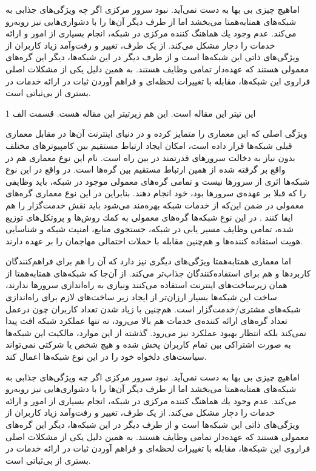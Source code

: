 \documentclass[12pt,twoside]{xepersian-magazine}
\begin{document}
\begin{article}{1}
اماهيچ چيزی بی‌ بها به دست نمی‌آید. نبود سرور مرکزی اگر چه  ويژگی‌های جذابی به شبکه‌های همتابه‌همتا می‌بخشد اما از طرف ديگر آن‌ها را با دشواری‌هايی نيز روبه‌رو می‌کند.  عدم وجود يك هماهنگ كننده مركزی در شبكه، انجام بسياری از امور و ارائه خدمات را  دچار مشكل می‌کند.  از يک طرف، تغيير و رفت‌وآمد زیاد کاربران از ويژگی‌های ذاتی اين شبکه‌ها است و از طرف ديگر در اين شبكه‌ها، ديگر اين گره‌های معمولی  هستند كه  عهده‌دار تمامی وظايف هستند. به همين دلیل يکی از مشکلات اصلی فراروی اين شبكه‌ها، مقابله با  تغييرات لحظه‌ای و فراهم آوردن ثبات در ارائه  خدمات در بستری از بی‌ثباتی است.
\end{article}

\articlesep

\begin{article}{1}
	{این تیتر این مقاله است.}
	{این هم زیرتیتر این مقاله هست.}
	{قسمت الف}
	{1}

\noindent{}
ويژگی اصلی که اين معماری را متمايز کرده و در دنيای اينترنت آن‌ها در مقابل معماری قبلی شبكه‌ها قرار داده است، امكان ايجاد ارتباط مستقيم  بين كامپيوترهای مختلف بدون نياز به دخالت سرورهای قدرتمند در بين راه است.  نام‌ اين نوع معماری هم در واقع بر گرفته شده از همین  ارتباط مستقیم بين گره‌ها است.  در واقع در اين نوع شبكه‌ها اثری از سرورها نيست و تمامی گره‌های معمولی موجود در شبكه، بايد وظايفی را که قبلا بر عهده‌ی سرورها بود، خود انجام دهند. بنابراين در اين نوع معماری گره‌های معمولی در ضمن اين‌که از خدمات شبکه بهره‌مند می‌شود بايد نقش خدمت‌گزار را هم ايفا کنند . در اين نوع شبکه‌ها گره‌های معمولی به كمك روش‌ها و پروتكل‌های توزيع شده، تمامی وظايف  مسير يابی در شبكه، جستجوی منابع، امنيت شبكه و شناسايی هويت استفاده كننده‌ها و هم‌چنين مقابله با حملات احتمالی مهاجمان را بر عهده دارند.

اما معماری همتابه‌همتا ويژگی‌های ديگری نيز دارد که آن را هم برای فراهم‌کنندگان کاربردها و هم برای استفاده‌کنندگان جذاب‌تر می‌کند.  از آن‌جا که شبکه‌های همتابه‌همتا از همان زيرساخت‌های اينترنت استفاده می‌کنند ونيازی به راه‌اندازی سرورها ندارند، ساخت اين شبكه‌ها بسيار ارزان‌تر از ايجاد زير ساخت‌های لازم برای راه‌اندازی شبكه‌های مشتری/خدمت‌گزار است.  هم‌چنين با زياد شدن تعداد کاربران چون درعمل تعداد گره‌های ارائه کننده‌ی خدمات هم بالا می‌رود، نه تنها عملكرد شبكه افت پيدا نمی‌كند بلكه انتظار بهبود عملکرد نيز می‌رود. گذشته از اين موارد، مالكيت اين شبكه‌ها به صورت اشتراكی بين تمام کاربران پخش شده و هيچ شخص يا شركتی نمی‌تواند سياست‌های دلخواه خود را در اين نوع شبكه‌ها اعمال کند.

اماهيچ چيزی بی‌ بها به دست نمی‌آید. نبود سرور مرکزی اگر چه  ويژگی‌های جذابی به شبکه‌های همتابه‌همتا می‌بخشد اما از طرف ديگر آن‌ها را با دشواری‌هايی نيز روبه‌رو می‌کند.  عدم وجود يك هماهنگ كننده مركزی در شبكه، انجام بسياری از امور و ارائه خدمات را  دچار مشكل می‌کند.  از يک طرف، تغيير و رفت‌وآمد زیاد کاربران از ويژگی‌های ذاتی اين شبکه‌ها است و از طرف ديگر در اين شبكه‌ها، ديگر اين گره‌های معمولی  هستند كه  عهده‌دار تمامی وظايف هستند. به همين دلیل يکی از مشکلات اصلی فراروی اين شبكه‌ها، مقابله با  تغييرات لحظه‌ای و فراهم آوردن ثبات در ارائه  خدمات در بستری از بی‌ثباتی است.  


\end{article}
\end{document}
